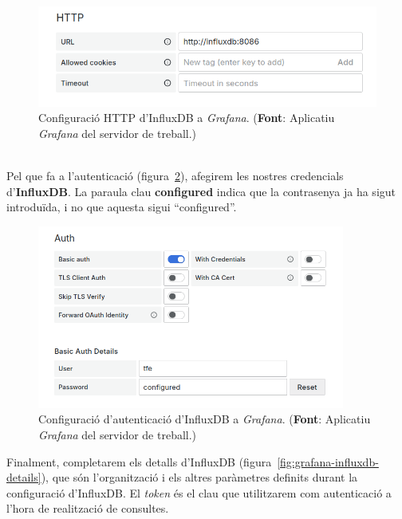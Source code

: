 \begin{figure}[htbp]
    \centerline{\includegraphics[width=\textwidth]{figures/grafana-influxdb-http}}
    \captionsetup{justification=centering}
    \caption[Configuració HTTP d'InfluxDB a \textit{Grafana}.]{Configuració HTTP d'InfluxDB a \textit{Grafana}. (\textbf{Font}: Aplicatiu \textit{Grafana} del servidor de treball.)}\label{fig:grafana-influxdb-http}
\end{figure}

\noindent \\
Pel que fa a l'autenticació (figura~\ref{fig:grafana-influxdb-auth}), afegirem les nostres credencials d'\textbf{InfluxDB}.
La paraula clau \textbf{configured} indica que la contrasenya ja ha sigut introduïda, i no que aquesta sigui ``configured''.

\begin{figure}[htbp]
    \centerline{\includegraphics[width=0.9\textwidth]{figures/grafana-influxdb-auth}}
    \captionsetup{justification=centering}
    \caption[Configuració d'autenticació d'InfluxDB a \textit{Grafana}.]{Configuració d'autenticació d'InfluxDB a \textit{Grafana}. (\textbf{Font}: Aplicatiu \textit{Grafana} del servidor de treball.)}\label{fig:grafana-influxdb-auth}
\end{figure}

\clearpage
\noindent
Finalment, completarem els detalls d'InfluxDB (figura~\ref{fig:grafana-influxdb-details}), que són l'organització i els altres paràmetres definits durant la configuració d'InfluxDB.
El \textit{token} és el clau que utilitzarem com autenticació a l'hora de realització de consultes.

